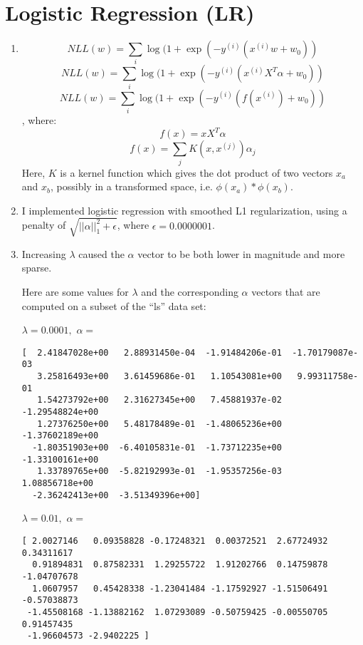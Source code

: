 \documentclass{paper}
\begin{document}
\section{Logistic Regression (LR)}

\begin{enumerate}
    \item
    \[ NLL(w) = \sum_i \log(1 + \exp(-y^{(i)} (x^{(i)} w + w_0)  ) \]
    \[ NLL(w) = \sum_i \log(1 + \exp(-y^{(i)} (x^{(i)} X^T \alpha + w_0)  ) \]
    \[ NLL(w) = \sum_i \log(1 + \exp(-y^{(i)} (f(x^{(i)}) + w_0)  ) \], where:
    \[ f(x) = x X^T \alpha \]
    \[ f(x) = \sum_j K(x, x^{(j)}) \alpha_j \]
    Here, $K$ is a kernel function which gives the dot product of two vectors $x_a$ and $x_b$, possibly in a transformed space, i.e. $\phi(x_a)*\phi(x_b)$.

    \item
        I implemented logistic regression with smoothed L1 regularization, using a penalty of $\sqrt{||\alpha||_1^2 + \epsilon}$, where $\epsilon = 0.0000001$.

    \item
        Increasing $\lambda$ caused the $\alpha$ vector to be both lower in magnitude and more sparse.

        Here are some values for $\lambda$ and the corresponding $\alpha$ vectors that are computed on a subset of the ``ls'' data set:


$\lambda = 0.0001,$
$\alpha = $
\begin{verbatim}
[  2.41847028e+00   2.88931450e-04  -1.91484206e-01  -1.70179087e-03
   3.25816493e+00   3.61459686e-01   1.10543081e+00   9.99311758e-01
   1.54273792e+00   2.31627345e+00   7.45881937e-02  -1.29548824e+00
   1.27376250e+00   5.48178489e-01  -1.48065236e+00  -1.37602189e+00
  -1.80351903e+00  -6.40105831e-01  -1.73712235e+00  -1.33100161e+00
   1.33789765e+00  -5.82192993e-01  -1.95357256e-03   1.08856718e+00
  -2.36242413e+00  -3.51349396e+00]
\end{verbatim}


$\lambda = 0.01,$
$\alpha = $
\begin{verbatim}
[ 2.0027146   0.09358828 -0.17248321  0.00372521  2.67724932  0.34311617
  0.91894831  0.87582331  1.29255722  1.91202766  0.14759878 -1.04707678
  1.0607957   0.45428338 -1.23041484 -1.17592927 -1.51506491 -0.57038873
 -1.45508168 -1.13882162  1.07293089 -0.50759425 -0.00550705  0.91457435
 -1.96604573 -2.9402225 ]
\end{verbatim}



\end{enumerate}
\end{document}
